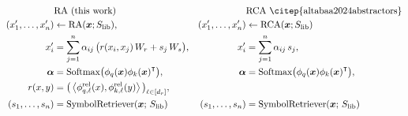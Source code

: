 \begin{align*}
&\text{RA (this work)}    & &\text{RCA \citep{altabaa2024abstractors}}\\
(x_1', \ldots, x_n') &\gets \RA(\x; \Slib), & (x_1', \ldots, x_n') &\gets \RCA(\x; \Slib)\\
x_i' &= \sum_{j=1}^{n} \alpha_{ij} \, \bigparen{r(x_i, x_j)\,W_r  + s_j \, W_s}, & x_i' &= \sum_{j=1}^{n} \alpha_{ij} \, s_j,\\
\bm{\alpha} &= \Softmax\bigparen{\phi_q(\x) {\phi_k(\x)}^\intercal}, & \bm{\alpha} &= \Softmax\bigparen{\phi_q(\x) {\phi_k(\x)}^\intercal},\\
r(x, y) &= \bigparen{\iprod{\phi_{q,\ell}^{\rel}(x)}{\phi_{k,\ell}^{\rel}(y)}}_{\ell \in [d_r]}, & \\
(s_1, \ldots, s_n) &= \SymbolRetriever(\x;\,\Slib) & (s_1, \ldots, s_n) &= \SymbolRetriever(\x;\,\Slib)
\end{align*}


